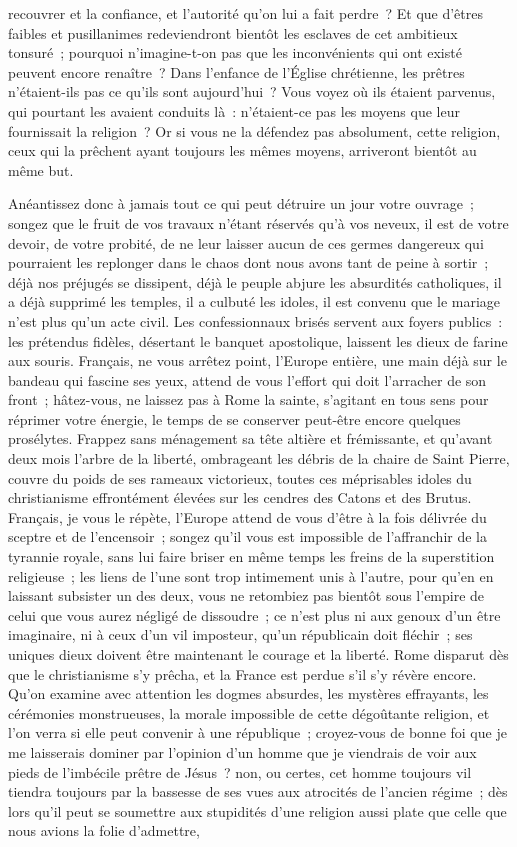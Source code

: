 \documentclass[french,twoside]{book} %
\begin{document}
recouvrer et la confiance, et l’autorité qu’on lui a fait perdre ? Et que d’êtres faibles et pusillanimes redeviendront bientôt les esclaves de cet ambitieux tonsuré ; pourquoi n’imagine-t-on pas que les inconvénients qui ont existé peuvent encore renaître ? Dans l’enfance de l’Église chrétienne, les prêtres n’étaient-ils pas ce qu’ils sont aujourd’hui ? Vous voyez où ils étaient parvenus, qui pourtant les avaient conduits là : n’étaient-ce pas les moyens que leur fournissait la religion ? Or si vous ne la défendez pas absolument, cette religion, ceux qui la prêchent ayant toujours les mêmes moyens, arriveront bientôt au même but.\par
Anéantissez donc à jamais tout ce qui peut détruire un jour votre ouvrage ; songez que le fruit de vos travaux n’étant réservés qu’à vos neveux, il est de votre devoir, de votre probité, de ne leur laisser aucun de ces germes dangereux qui pourraient les replonger dans le chaos dont nous avons tant de peine à sortir ; déjà nos préjugés se dissipent, déjà le peuple abjure les absurdités catholiques, il a déjà supprimé les temples, il a culbuté les idoles, il est convenu que le mariage n’est plus qu’un acte civil. Les confessionnaux brisés servent aux foyers publics : les prétendus fidèles, désertant le banquet apostolique, laissent les dieux de farine aux souris. Français, ne vous arrêtez point, l’Europe entière, une main déjà sur le bandeau qui fascine ses yeux, attend de vous l’effort qui doit l’arracher de son front ; hâtez-vous, ne laissez pas à Rome la sainte, s’agitant en tous sens pour réprimer votre énergie, le temps de se conserver peut-être encore quelques prosélytes. Frappez sans ménagement sa tête altière et frémissante, et qu’avant deux mois l’arbre de la liberté, ombrageant les débris de la chaire de Saint Pierre, couvre du poids de ses rameaux victorieux, toutes ces méprisables idoles du christianisme effrontément élevées sur les cendres des Catons et des Brutus. Français, je vous le répète, l’Europe attend de vous d’être à la fois délivrée du sceptre et de l’encensoir ; songez qu’il vous est impossible de l’affranchir de la tyrannie royale, sans lui faire briser en même temps les freins de la superstition religieuse ; les liens de l’une sont trop intimement unis à l’autre, pour qu’en en laissant subsister un des deux, vous ne retombiez pas bientôt sous l’empire de celui que vous aurez négligé de dissoudre ; ce n’est plus ni aux genoux d’un être imaginaire, ni à ceux d’un vil imposteur, qu’un républicain doit fléchir ; ses uniques dieux doivent être maintenant le courage et la liberté. Rome disparut dès que le christianisme s’y prêcha, et la France est perdue s’il s’y révère encore. Qu’on examine avec attention les dogmes absurdes, les mystères effrayants, les cérémonies monstrueuses, la morale impossible de cette dégoûtante religion, et l’on verra si elle peut convenir à une république ; croyez-vous de bonne foi que je me laisserais dominer par l’opinion d’un homme que je viendrais de voir aux pieds de l’imbécile prêtre de Jésus ? non, ou certes, cet homme toujours vil tiendra toujours par la bassesse de ses vues aux atrocités de l’ancien régime ; dès lors qu’il peut se soumettre aux stupidités d’une religion aussi plate que celle que nous avions la folie d’admettre, 
\end{document}
